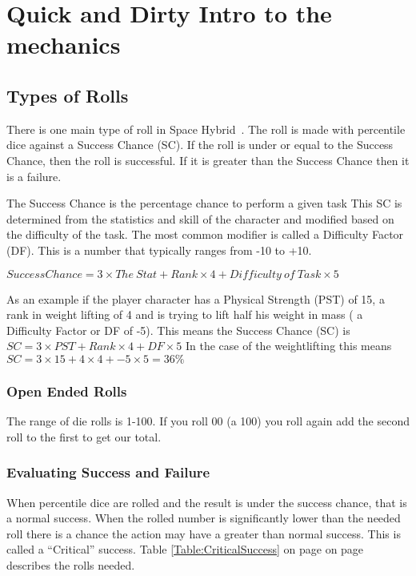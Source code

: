 \chapter{Quick and Dirty Intro to the mechanics}

\section{Types of Rolls}

There is one main type of roll in Space Hybrid\ . The roll is 
made with percentile dice against a Success Chance (SC). If the roll 
is under or equal to the Success Chance, then the roll is successful.
If it is greater than the Success Chance then it is a failure.

The Success Chance is the percentage chance to perform a given task This SC is
determined from the statistics and skill of the character 
and modified based on the difficulty of the task. The most common 
modifier is called a Difficulty Factor (DF). This is a number that typically 
ranges from -10 to +10.

$ {Success Chance} = 3 \times {The\ Stat} + Rank \times 4 + {Difficulty\ of\ Task} \times 5 $

As an example if the player character has a Physical Strength (PST) of 15, a rank in 
weight lifting of 4 and is trying to lift half his weight in mass ( a Difficulty Factor or DF of -5). 
This means the Success Chance (SC) is $ SC = 3 \times PST + Rank \times 4 + DF \times 5 $
In the case of the weightlifting this means $ SC = 3 \times 15 + 4 \times 4 + -5 \times 5  = 36\% $

\subsection{Open Ended Rolls}

The range of die rolls is 1-100. If you roll 00 (a 100) you roll again add
the second roll to the first to get our total.

\subsection{Evaluating Success and Failure}

When percentile dice are rolled and the result is under the success chance, that
is a normal success. When the rolled number is significantly lower than the needed 
roll there is a chance the action may have a greater than normal success. This is 
called a ``Critical'' success. Table \ref{Table:CriticalSuccess} on page on
page~\pageref{Table:CriticalSuccess} describes the rolls needed.

